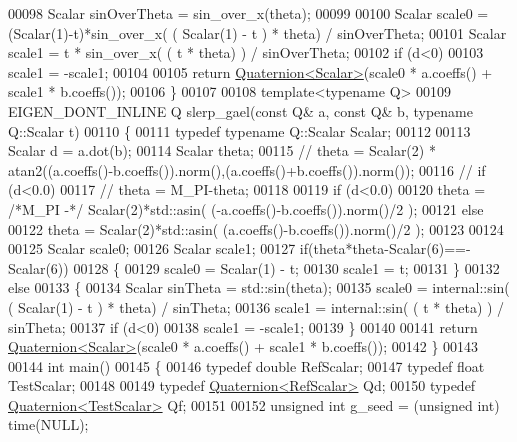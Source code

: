 \begin{DoxyCode}
00098   Scalar sinOverTheta = sin\_over\_x(theta);
00099 
00100   Scalar scale0 = (Scalar(1)-t)*sin\_over\_x( ( Scalar(1) - t ) * theta) / sinOverTheta;
00101   Scalar scale1 = t * sin\_over\_x( ( t * theta) ) / sinOverTheta;
00102   \textcolor{keywordflow}{if} (d<0)
00103     scale1 = -scale1;
00104 
00105   \textcolor{keywordflow}{return} \hyperlink{group___geometry___module_class_eigen_1_1_quaternion}{Quaternion<Scalar>}(scale0 * a.coeffs() + scale1 * b.coeffs());
00106 \}
00107 
00108 \textcolor{keyword}{template}<\textcolor{keyword}{typename} Q>
00109 EIGEN\_DONT\_INLINE Q slerp\_gael(\textcolor{keyword}{const} Q& a, \textcolor{keyword}{const} Q& b, \textcolor{keyword}{typename} Q::Scalar t)
00110 \{
00111   \textcolor{keyword}{typedef} \textcolor{keyword}{typename} Q::Scalar Scalar;
00112   
00113   Scalar d = a.dot(b);
00114   Scalar theta;
00115 \textcolor{comment}{//   theta = Scalar(2) * atan2((a.coeffs()-b.coeffs()).norm(),(a.coeffs()+b.coeffs()).norm());}
00116 \textcolor{comment}{//   if (d<0.0)}
00117 \textcolor{comment}{//     theta = M\_PI-theta;}
00118   
00119   \textcolor{keywordflow}{if} (d<0.0)
00120     theta = \textcolor{comment}{/*M\_PI -*/} Scalar(2)*std::asin( (-a.coeffs()-b.coeffs()).norm()/2 );
00121   \textcolor{keywordflow}{else}
00122     theta = Scalar(2)*std::asin( (a.coeffs()-b.coeffs()).norm()/2 );
00123   
00124   
00125   Scalar scale0;
00126   Scalar scale1;
00127   \textcolor{keywordflow}{if}(theta*theta-Scalar(6)==-Scalar(6))
00128   \{
00129     scale0 = Scalar(1) - t;
00130     scale1 = t;
00131   \}
00132   \textcolor{keywordflow}{else}
00133   \{
00134     Scalar sinTheta = std::sin(theta);
00135     scale0 = internal::sin( ( Scalar(1) - t ) * theta) / sinTheta;
00136     scale1 = internal::sin( ( t * theta) ) / sinTheta;
00137     \textcolor{keywordflow}{if} (d<0)
00138       scale1 = -scale1;
00139   \}
00140 
00141   \textcolor{keywordflow}{return} \hyperlink{group___geometry___module_class_eigen_1_1_quaternion}{Quaternion<Scalar>}(scale0 * a.coeffs() + scale1 * b.coeffs());
00142 \}
00143 
00144 \textcolor{keywordtype}{int} main()
00145 \{
00146   \textcolor{keyword}{typedef} \textcolor{keywordtype}{double} RefScalar;
00147   \textcolor{keyword}{typedef} \textcolor{keywordtype}{float} TestScalar;
00148   
00149   \textcolor{keyword}{typedef} \hyperlink{group___geometry___module_class_eigen_1_1_quaternion}{Quaternion<RefScalar>}  Qd;
00150   \textcolor{keyword}{typedef} \hyperlink{group___geometry___module_class_eigen_1_1_quaternion}{Quaternion<TestScalar>} Qf;
00151   
00152   \textcolor{keywordtype}{unsigned} \textcolor{keywordtype}{int} g\_seed = (\textcolor{keywordtype}{unsigned} int) time(NULL);

\end{DoxyCode}
